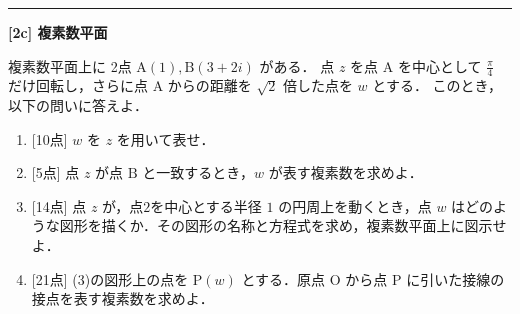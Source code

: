\documentclass{jlreq}
\theoremstyle{definition}
\begin{document}
\vspace{10mm}
\hrule
\vspace{10mm}

\noindent\textbf{\large [2c] 複素数平面}

複素数平面上に 2点 $\mathrm{A}(1), \mathrm{B}(3+2i)$ がある．
点 $z$ を点 $\mathrm{A}$ を中心として $\displaystyle\frac{\pi}{4}$ だけ回転し，さらに点 $\mathrm{A}$ からの距離を $\sqrt{2}$ 倍した点を $w$ とする．
このとき，以下の問いに答えよ．

\begin{enumerate}[label=(\arabic*)]
    \item {[10点]} $w$ を $z$ を用いて表せ．
    \item {[5点]} 点 $z$ が点 $\mathrm{B}$ と一致するとき，$w$ が表す複素数を求めよ．
    \item {[14点]} 点 $z$ が，点$2$を中心とする半径 $1$ の円周上を動くとき，点 $w$ はどのような図形を描くか．その図形の名称と方程式を求め，複素数平面上に図示せよ．
    \item {[21点]} (3)の図形上の点を $\mathrm{P}(w)$ とする．原点 $\mathrm{O}$ から点 $\mathrm{P}$ に引いた接線の接点を表す複素数を求めよ．
\end{enumerate}
\end{document}
